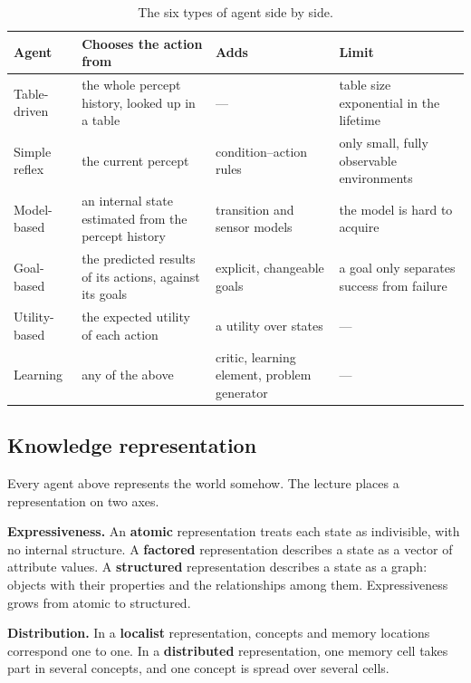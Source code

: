 \begin{table}[htbp]
  \centering
  \renewcommand{\arraystretch}{1.08}
  \caption{The six types of agent side by side.}\label{tab:agent-types}
  \begin{tabularx}{\linewidth}{@{}lLLL@{}}
    \toprule
    \textbf{Agent} & \textbf{Chooses the action from} & \textbf{Adds} &
      \textbf{Limit} \\
    \midrule
    Table-driven & the whole percept history, looked up in a table & --- &
      table size exponential in the lifetime \\
    Simple reflex & the current percept & condition--action rules &
      only small, fully observable environments \\
    Model-based & an internal state estimated from the percept history &
      transition and sensor models & the model is hard to acquire \\
    Goal-based & the predicted results of its actions, against its goals &
      explicit, changeable goals & a goal only separates success from
      failure \\
    Utility-based & the expected utility of each action & a utility over states
      & --- \\
    Learning & any of the above & critic, learning element, problem generator
      & --- \\
    \bottomrule
  \end{tabularx}
\end{table}

\subsection{Knowledge representation}\label{sec:agents-representation}

Every agent above represents the world somehow. The lecture places a
representation on two axes.

\textbf{Expressiveness.} An \textbf{atomic} representation treats each state as
indivisible, with no internal structure. A \textbf{factored} representation
describes a state as a vector of attribute values. A \textbf{structured}
representation describes a state as a graph: objects with their properties and
the relationships among them. Expressiveness grows from atomic to structured.

\textbf{Distribution.} In a \textbf{localist} representation, concepts and
memory locations correspond one to one. In a \textbf{distributed}
representation, one memory cell takes part in several concepts, and one
concept is spread over several cells.
